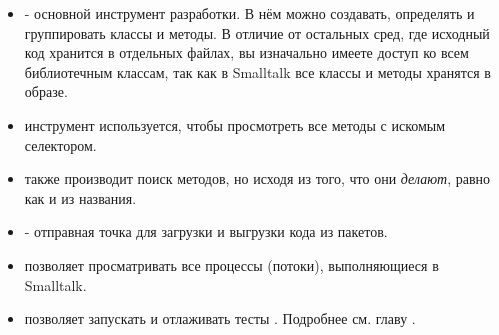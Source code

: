 \documentclass[a4paper,10pt,twoside]{book}
\begin{document}
\begin{itemize}
	\item {} - основной инструмент разработки. В нём можно создавать, определять и группировать классы и методы. В отличие от остальных сред, где исходный код хранится в отдельных файлах, вы изначально имеете доступ ко всем библиотечным классам, так как в Smalltalk все классы и методы хранятся в образе.

	\item{} инструмент используется, чтобы просмотреть все методы с искомым селектором.
	
	\item{} также производит поиск методов, но исходя из того, что они \emph{делают}, равно как и из названия.
	
	\item{} - отправная точка для загрузки и выгрузки кода из  пакетов.
	
	\item{} позволяет просматривать все процессы (потоки), выполняющиеся в Smalltalk.
	
	\item{} позволяет запускать и отлаживать тесты \SUnit. Подробнее см. главу .
	

\end{itemize}
\end{document}
